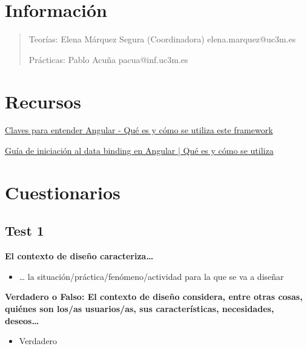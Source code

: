 \documentclass[12pt]{report} %
\begin{document}
\listoffigures
\thispagestyle{fancy}

\listoftables
\thispagestyle{fancy}

\clearpage
{} %




\section{Información}
\begin{quote}
Teorías: Elena Márquez Segura (Coordinadora) elena.marquez@uc3m.es

Prácticas: Pablo Acuña pacua@inf.uc3m.es
\end{quote}

\section{Recursos}

\href{https://www.acontracorrientech.com/claves-para-entender-angular-que-es-y-como-se-utiliza/}{Claves para entender Angular - Qué es y cómo se utiliza este framework}

\href{https://www.acontracorrientech.com/guia-practica-del-databinding-en-angular/}{Guía de iniciación al data binding en Angular | Qué es y cómo se utiliza}

\section{Cuestionarios}

\subsection{Test 1}

\textbf{El contexto de diseño caracteriza\ldots{}}
\begin{itemize}
  \item \ldots{} la situación/práctica/fenómeno/actividad para la que se va a diseñar
\end{itemize}

\textbf{Verdadero o Falso: El contexto de diseño considera, entre otras cosas, quiénes son los/as usuarios/as, sus características, necesidades, deseos\ldots{}}
\begin{itemize}
  \item Verdadero
\end{itemize}
\end{document}
